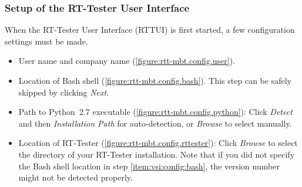 \subsubsection{Setup of the RT-Tester User Interface}
When the RT-Tester User Interface (RTTUI) is first started, a few configuration
settings must be made.
%
%
%
\begin{itemize}
    \item User name and company name (\autoref{figure:rtt-mbt.config.user}).
    \item\label{item:vsi:config:bash} Location of Bash shell (\autoref{figure:rtt-mbt.config.bash}).
    This step can be safely skipped by clicking \emph{Next}.
    \item Path to Python~2.7 executable (\autoref{figure:rtt-mbt.config.python}):
    Click \emph{Detect} and then \emph{Installation Path} for auto-detection,
    or \emph{Browse} to select manually.
    \item Location of RT-Tester (\autoref{figure:rtt-mbt.config.rttester}):
    Click \emph{Browse} to select the directory of your RT-Tester installation.
    Note that if you did not specify the Bash shell location in step \ref{item:vsi:config:bash},
    the version number might not be detected properly.
\end{itemize}
%
%
%
